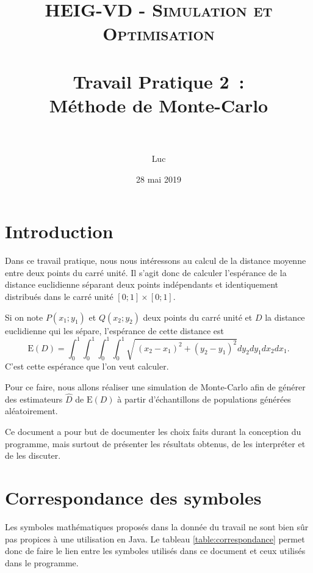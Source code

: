 \documentclass[paper=a4, fontsize=11pt]{scrartcl}
\title{
  \normalfont \normalsize
  \textsc{HEIG-VD - Simulation et Optimisation} \\[10pt]
  \horrule{1pt} \\[0.4cm] %
  \huge Travail Pratique 2~:\\Méthode de Monte-Carlo \\
  \horrule{2pt} \\[0.4cm] %
}
\author{Luc \bsc{Wachter}}
\date{28 mai 2019}
\begin{document}
\lstset{language=Java}

\maketitle

\section{Introduction}

Dans ce travail pratique, nous nous intéressons au calcul de la distance moyenne entre deux points du carré unité. Il s'agit donc de calculer l'espérance de la distance euclidienne séparant deux points indépendants et identiquement distribués dans le carré unité $[0;1] \times [0;1]$.

Si on note $P(x_1;y_1)$ et $Q(x_2;y_2)$ deux points du carré unité et $D$ la distance euclidienne qui les sépare, l'espérance de cette distance est
\begin{equation*}
  \text{E}(D) = \int _0^1\int _0^1\int _0^1\int _0^1\sqrt{\:\left(x_2-x_1\right)^2+\left(y_2-y_1\right)^2}dy_2dy_1dx_2dx_1.
\end{equation*}
C'est cette espérance que l'on veut calculer.

Pour ce faire, nous allons réaliser une simulation de Monte-Carlo afin de générer des estimateurs $\widehat{D}$ de $\text{E}(D)$ à partir d'échantillons de populations générées aléatoirement.

Ce document a pour but de documenter les choix faits durant la conception du programme, mais surtout de présenter les résultats obtenus, de les interpréter et de les discuter.

\newpage

\section{Correspondance des symboles}

Les symboles mathématiques proposés dans la donnée du travail ne sont bien sûr pas propices à une utilisation en Java. Le tableau \ref{table:correspondance} permet donc de faire le lien entre les symboles utilisés dans ce document et ceux utilisés dans le programme.
\end{document}
